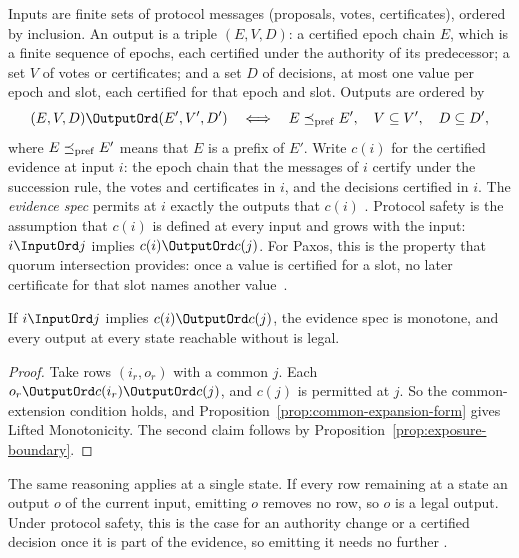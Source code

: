 Inputs are finite sets of protocol messages (proposals, votes,
certificates), ordered by inclusion.  An output is a triple $(E,V,D)$: a
certified epoch chain $E$, which is a finite sequence of epochs, each
certified under the authority of its predecessor; a set $V$ of votes or
certificates; and a set $D$ of decisions, at most one value per epoch and slot,
each certified for that epoch and slot.  Outputs are ordered by
\begin{equation}
  (E,V,D)\OutputOrd(E',V',D')
  \quad\Longleftrightarrow\quad
  E\preceq_{\rm pref}E',\quad V\subseteq V',\quad D\subseteq D',
  \label{eq:authority-refinement}
\end{equation}
where $E\preceq_{\rm pref}E'$ means that $E$ is a prefix of $E'$.  Write $c(i)$
for the certified evidence at input $i$: the epoch chain that the messages of
$i$ certify under the succession rule, the votes and certificates in $i$, and
the decisions certified in $i$.  The \emph{evidence spec} permits at $i$
exactly the outputs that $c(i)$ \outrel.  Protocol safety is the assumption
that $c(i)$ is defined at every input and grows with the input:
$i\InputOrd j$ implies $c(i)\OutputOrd c(j)$.  For Paxos, this is the
property that quorum intersection provides: once a value is certified for a
slot, no later certificate for that slot names another
value~\cite{lamport2001paxos}.

\begin{proposition}
\label{prop:monotone-evidence}
If $i\InputOrd j$ implies $c(i)\OutputOrd c(j)$, the evidence spec is
monotone, and every output at every state reachable without \commitment is
legal.
\end{proposition}

\begin{proof}
Take rows $(i_r,o_r)$ with a common \indesc $j$.  Each
$o_r\OutputOrd c(i_r)\OutputOrd c(j)$, and $c(j)$ is permitted at $j$.  So the
common-extension condition holds, and
Proposition~\ref{prop:common-expansion-form} gives Lifted Monotonicity.  The
second claim follows by Proposition~\ref{prop:exposure-boundary}.
\end{proof}

The same reasoning applies at a single state.  If every row remaining at a
state \outrel an output $o$ of the current input, emitting $o$ removes no row,
so $o$ is a legal output.  Under protocol safety, this is the case for an
authority change or a certified decision once it is part of the evidence, so
emitting it needs no further \commitment.

